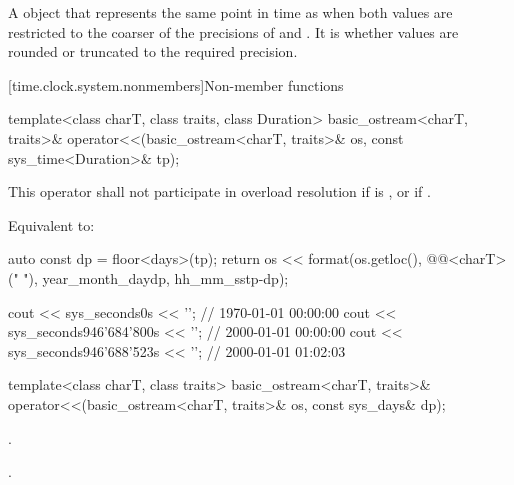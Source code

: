 \begin{itemdescr}
\pnum
\returns
A  object that represents the same point in time as 
when both values are restricted to the coarser of the precisions of  and
.
It is 
whether values are rounded or truncated to the required precision.
\end{itemdescr}

[time.clock.system.nonmembers]{Non-member functions}

%
\begin{itemdecl}
template<class charT, class traits, class Duration>
  basic_ostream<charT, traits>&
    operator<<(basic_ostream<charT, traits>& os, const sys_time<Duration>& tp);
\end{itemdecl}

\begin{itemdescr}
\pnum
\remarks
This operator shall not participate in overload resolution if
 is ,
or if .

\pnum
\effects
Equivalent to:
\begin{codeblock}
auto const dp = floor<days>(tp);
return os << format(os.getloc(), @@<charT>("{} {}"),
                    year_month_day{dp}, hh_mm_ss{tp-dp});
\end{codeblock}

\pnum
\begin{example}
\begin{codeblock}
cout << sys_seconds{0s} << '\n';                // 1970-01-01 00:00:00
cout << sys_seconds{946'684'800s} << '\n';      // 2000-01-01 00:00:00
cout << sys_seconds{946'688'523s} << '\n';      // 2000-01-01 01:02:03
\end{codeblock}
\end{example}
\end{itemdescr}

%
\begin{itemdecl}
template<class charT, class traits>
  basic_ostream<charT, traits>&
    operator<<(basic_ostream<charT, traits>& os, const sys_days& dp);
\end{itemdecl}

\begin{itemdescr}
\pnum
\effects
{}.

\pnum
\returns
{}.
\end{itemdescr}

